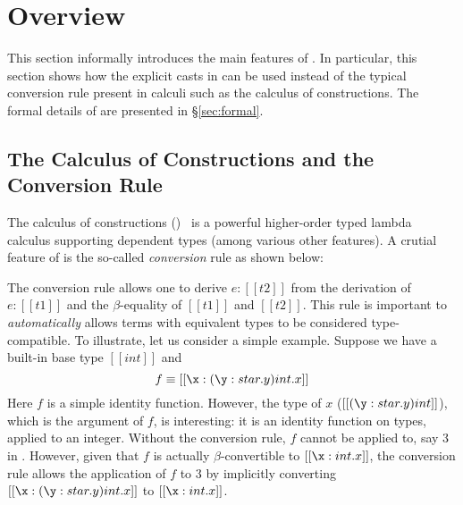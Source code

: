 \visiblecomments

\newlength{\blanklineskip}
\setlength{\blanklineskip}{0.66084ex}

\newcommand{\hsindent}[1]{\quad}%
\let\hspre\empty
\let\hspost\empty
\newcommand{\NB}{\textbf{NB}}
\newcommand{\Todo}[1]{$\langle$\textbf{To do:}~#1$\rangle$}

\EndFmtInput
\makeatother
%

\section{Overview}

This section informally introduces the main features of \name. In
particular, this section shows how the explicit casts in \name can be
used instead of the typical conversion rule present in calculi such as
the calculus of constructions. The formal details of \name are
presented in \S\ref{sec:formal}.

\subsection{The Calculus of Constructions and the Conversion Rule}
\label{sec:coc}

The calculus of constructions (\coc)~\cite{coc} is a powerful
higher-order typed lambda calculus supporting dependent types (among
various other features).  A crutial
feature of \coc is the so-called \emph{conversion}
rule as shown below: \ottusedrule{\ottdruleTccXXConv{}}


The conversion rule allows one to derive $e:[[t2]]$ from the
derivation of $e:[[t1]]$ and the $\beta$-equality of $[[t1]]$ and
$[[t2]]$. This rule is important to \emph{automatically} allows 
terms with equivalent types to be considered type-compatible. 
To illustrate, let us consider a simple example. Suppose
we have a built-in base type $[[int]]$ and \[f \equiv [[\x:(\y:star.y)int.x]] \]
Here $f$ is a simple identity function. However, the type 
of $x$  ($[[(\y:star.y)int]]$), which is the argument of $f$, is interesting: it is 
an identity function on types, applied to an integer. 
Without the conversion rule, $f$ cannot be
applied to, say $3$ in \coc. However, given that $f$ is actually
$\beta$-convertible to $[[\x:int.x]]$, the conversion rule allows
the application of $f$ to $3$ by implicitly converting
$[[\x:(\y:star.y)int.x]]$ to $[[\x:int.x]]$.

